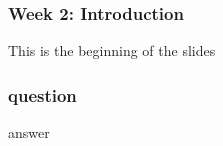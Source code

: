 \documentclass[11pt]{beamer}
\begin{document}
\begin{frame}
\frametitle{Week 2: Introduction}
This is the beginning of the slides
\end{frame}

\begin{frame}
\frametitle{question}
answer
\end{frame}
\end{document}
